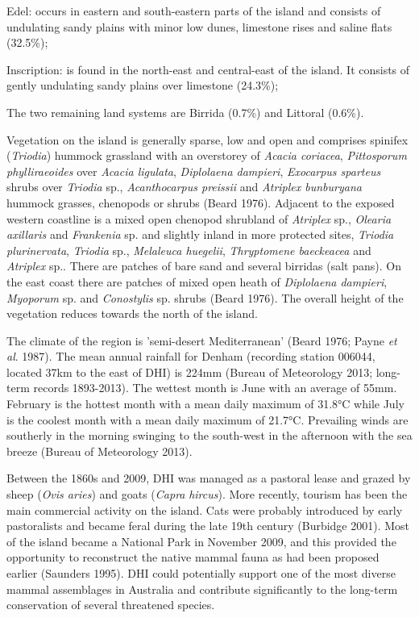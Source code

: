 \documentclass[version=last,
    paper=a4,                               %
    10pt,                                   %
    dvipsnames,
    oneside,                              %
    headings=openany,                       %
    open=any,
    BCOR=7mm,                               %
    DIV=15,     %
]{scrbook}
\begin{document}
Edel: occurs in eastern and south-eastern parts of the island and
consists of undulating sandy plains with minor low dunes, limestone
rises and saline flats (32.5\%);

Inscription: is found in the north-east and central-east of the island.
It consists of gently undulating sandy plains over limestone (24.3\%);

The two remaining land systems are Birrida (0.7\%) and Littoral (0.6\%).

Vegetation on the island is generally sparse, low and open and comprises
spinifex (\emph{Triodia}) hummock grassland with an overstorey of
\emph{Acacia coriacea}, \emph{Pittosporum phylliraeoides} over
\emph{Acacia ligulata}, \emph{Diplolaena dampieri}, \emph{Exocarpus
sparteus} shrubs over \emph{Triodia} sp., \emph{Acanthocarpus preissii}
and \emph{Atriplex bunburyana} hummock grasses, chenopods or shrubs
(Beard 1976). Adjacent to the exposed western coastline is a mixed open
chenopod shrubland of \emph{Atriplex} sp., \emph{Olearia axillaris} and
\emph{Frankenia} sp. and slightly inland in more protected sites,
\emph{Triodia plurinervata}, \emph{Triodia} sp., \emph{Melaleuca
huegelii}, \emph{Thryptomene baeckeacea} and \emph{Atriplex} sp.. There
are patches of bare sand and several birridas (salt pans). On the east
coast there are patches of mixed open heath of \emph{Diplolaena
dampieri}, \emph{Myoporum} sp. and \emph{Conostylis} sp. shrubs (Beard
1976). The overall height of the vegetation reduces towards the north of
the island.

The climate of the region is 'semi-desert Mediterranean' (Beard 1976;
Payne \emph{et al}. 1987). The mean annual rainfall for Denham
(recording station 006044, located 37km to the east of DHI) is 224mm
(Bureau of Meteorology 2013; long-term records 1893-2013). The wettest
month is June with an average of 55mm. February is the hottest month
with a mean daily maximum of 31.8°C while July is the coolest month with
a mean daily maximum of 21.7°C. Prevailing winds are southerly in the
morning swinging to the south-west in the afternoon with the sea breeze
(Bureau of Meteorology 2013).

Between the 1860s and 2009, DHI was managed as a pastoral lease and
grazed by sheep (\emph{Ovis aries}) and goats (\emph{Capra}
\emph{hircus}). More recently, tourism has been the main commercial
activity on the island. Cats were probably introduced by early
pastoralists and became feral during the late 19th century (Burbidge
2001). Most of the island became a National Park in November 2009, and
this provided the opportunity to reconstruct the native mammal fauna as
had been proposed earlier (Saunders 1995). DHI could potentially support
one of the most diverse mammal assemblages in Australia and contribute
significantly to the long-term conservation of several threatened
species.
\end{document}
